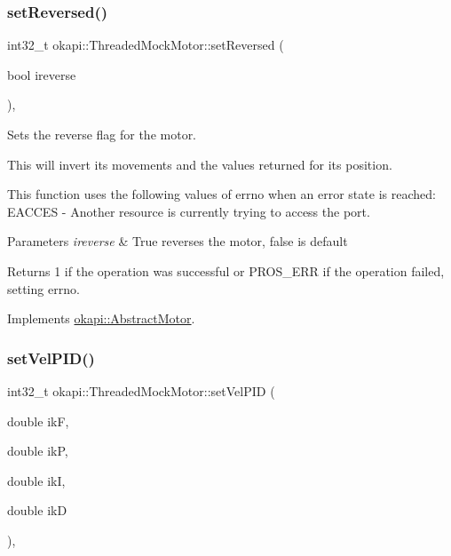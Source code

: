 \mbox{\label{classokapi_1_1ThreadedMockMotor_ab5ad496fc010d262d61353b72966adf2}} 
\subsubsection{\texorpdfstring{setReversed()}{setReversed()}}
{\footnotesize\ttfamily int32\+\_\+t okapi\+::\+Threaded\+Mock\+Motor\+::set\+Reversed (\begin{DoxyParamCaption}\item[{bool}]{ireverse }\end{DoxyParamCaption})\hspace{0.3cm}{\ttfamily [override]}, {\ttfamily [virtual]}}



Sets the reverse flag for the motor. 

This will invert its movements and the values returned for its position.

This function uses the following values of errno when an error state is reached\+: E\+A\+C\+C\+ES -\/ Another resource is currently trying to access the port.


\begin{DoxyParams}{Parameters}
{\em ireverse} & True reverses the motor, false is default \\
\hline
\end{DoxyParams}
\begin{DoxyReturn}{Returns}
1 if the operation was successful or P\+R\+O\+S\+\_\+\+E\+RR if the operation failed, setting errno. 
\end{DoxyReturn}


Implements \mbox{\hyperlink{classokapi_1_1AbstractMotor_a72a6a4eb9d237ad57b92401b08ad64fa}{okapi\+::\+Abstract\+Motor}}.

\mbox{\label{classokapi_1_1ThreadedMockMotor_a7552659609cad8e9a2ca2c6eb2e1737b}} 
\subsubsection{\texorpdfstring{setVelPID()}{setVelPID()}}
{\footnotesize\ttfamily int32\+\_\+t okapi\+::\+Threaded\+Mock\+Motor\+::set\+Vel\+P\+ID (\begin{DoxyParamCaption}\item[{double}]{ikF,  }\item[{double}]{ikP,  }\item[{double}]{ikI,  }\item[{double}]{ikD }\end{DoxyParamCaption})\hspace{0.3cm}{\ttfamily [override]}, {\ttfamily [virtual]}}



